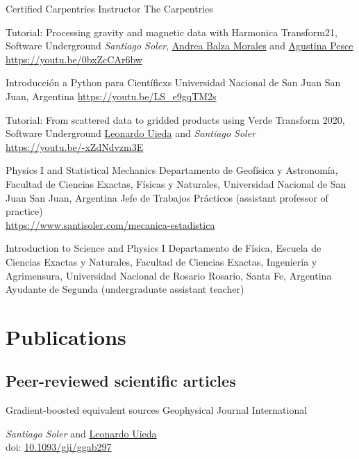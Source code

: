 \documentclass[a4paper,12pt,sans,colorlinks]{moderncv/moderncv}
\newcommand{\me}{\emph{Santiago Soler}}
\newcommand{\agustina}{\href{https://aguspesce.github.io}{Agustina Pesce}}
\newcommand{\andrea}{\href{https://www.andreabalza.com/}{Andrea Balza Morales}}
\newcommand{\leo}{\href{https://www.leouieda.com}{Leonardo Uieda}}
\newcommand{\doi}[1]{
    \href{https://doi.org/#1}{#1}
}
\begin{document}
{Certified Carpentries Instructor} %
{The Carpentries} %
{} %
{} %
{} %

{Tutorial: Processing gravity and magnetic data with Harmonica}
{Transform21, Software Underground}
{}
{}
{
    \me{}, \andrea{} and \agustina{}
    \\
    \url{https://youtu.be/0bxZcCAr6bw}
}

{Introducción a Python para Científicxs} %
{Universidad Nacional de San Juan} %
{San Juan, Argentina} %
{} %
{\url{https://youtu.be/LS_e9gqTM2s}}

{Tutorial: From scattered data to gridded products using Verde}
{Transform 2020, Software Underground}
{}
{}
{
    \leo{} and \me{}
    \\
    \url{https://youtu.be/-xZdNdvzm3E}
}

{Physics I and Statistical Mechanics}
{
    Departamento de Geofísica y Astronomía,
    Facultad de Ciencias Exactas, Físicas y Naturales,
    Universidad Nacional de San Juan
}
{San Juan, Argentina}
{}
{
    Jefe de Trabajos Prácticos (assistant professor of practice)
    \\
    \url{https://www.santisoler.com/mecanica-estadistica}
}

{Introduction to Science and Physics I}
{
    Departamento de Física,
    Escuela de Ciencias Exactas y Naturales,
    Facultad de Ciencias Exactas, Ingeniería y Agrimensura,
    Universidad Nacional de Rosario
}
{Rosario, Santa Fe, Argentina}
{}
{Ayudante de Segunda (undergraduate assistant teacher)}


\section{Publications}

\subsection{Peer-reviewed scientific articles}

{Gradient-boosted equivalent sources}
{Geophysical Journal International}
{}
{}
{
    \me{} and \leo{}
    \\
    doi: \doi{10.1093/gji/ggab297}
}
\end{document}
